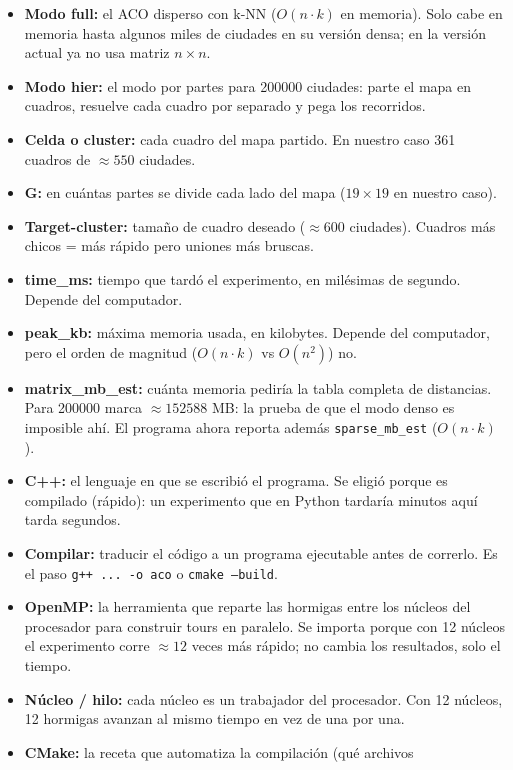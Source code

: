 \documentclass[12pt,a4paper]{article}
\begin{document}
\begin{itemize}
cruzados; si el tour se acorta, se queda con el cambio. Explica buena parte de
la calidad obtenida.
\item \textbf{Modo full:} el ACO disperso con k-NN ($O(n \cdot k)$ en memoria).
Solo cabe en memoria hasta algunos miles de ciudades en su versión densa; en
la versión actual ya no usa matriz $n \times n$.
\item \textbf{Modo hier:} el modo por partes para 200000 ciudades: parte el
mapa en cuadros, resuelve cada cuadro por separado y pega los recorridos.
\item \textbf{Celda o cluster:} cada cuadro del mapa partido. En nuestro caso
361 cuadros de $\approx 550$ ciudades.
\item \textbf{G:} en cuántas partes se divide cada lado del mapa ($19 \times
19$ en nuestro caso).
\item \textbf{Target-cluster:} tamaño de cuadro deseado ($\approx 600$
ciudades). Cuadros más chicos = más rápido pero uniones más bruscas.
\item \textbf{time\_ms:} tiempo que tardó el experimento, en milésimas de
segundo. Depende del computador.
\item \textbf{peak\_kb:} máxima memoria usada, en kilobytes. Depende del
computador, pero el orden de magnitud ($O(n \cdot k)$ vs $O(n^2)$) no.
\item \textbf{matrix\_mb\_est:} cuánta memoria pediría la tabla completa de
distancias. Para 200000 marca $\approx 152588$ MB: la prueba de que el modo
denso es imposible ahí. El programa ahora reporta además
\texttt{sparse\_mb\_est} ($O(n \cdot k)$).
\item \textbf{C++:} el lenguaje en que se escribió el programa. Se eligió
porque es compilado (rápido): un experimento que en Python tardaría minutos
aquí tarda segundos.
\item \textbf{Compilar:} traducir el código a un programa ejecutable antes de
correrlo. Es el paso \texttt{g++ ... -o aco} o \texttt{cmake --build}.
\item \textbf{OpenMP:} la herramienta que reparte las hormigas entre los
núcleos del procesador para construir tours en paralelo. Se importa porque
con 12 núcleos el experimento corre $\approx 12$ veces más rápido; no cambia
los resultados, solo el tiempo.
\item \textbf{Núcleo / hilo:} cada núcleo es un trabajador del procesador.
Con 12 núcleos, 12 hormigas avanzan al mismo tiempo en vez de una por una.
\item \textbf{CMake:} la receta que automatiza la compilación (qué archivos

\end{itemize}
\end{document}
